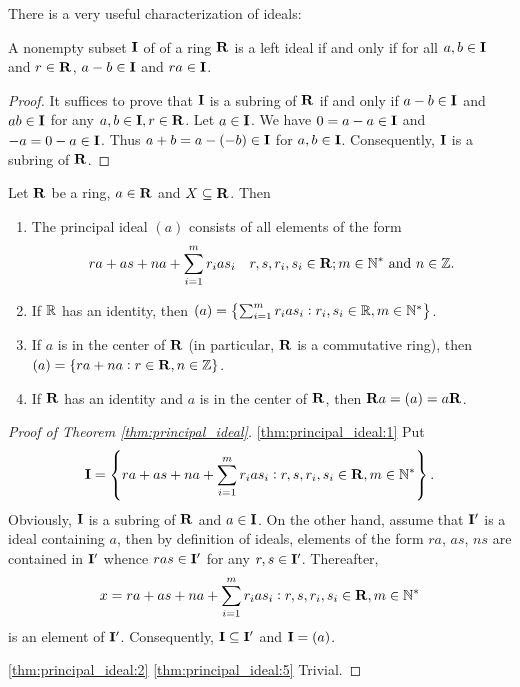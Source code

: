 There is a very useful characterization of ideals:
\begin{thm}
\label{thm:characterization_of_ideals}
A nonempty subset $\mathbf{I}$ of of a ring $\mathbf{R}$ is a left ideal if and only if 
for all $a, b \in \mathbf{I}$ and $r \in \mathbf{R}$, $a - b \in \mathbf{I}$ and $ra \in \mathbf{I}$. 
\end{thm}
\begin{proof}
It suffices to prove that $\mathbf{I}$ is a subring of $\mathbf{R}$ if and only if 
$a - b \in \mathbf{I}$ and $ab \in \mathbf{I}$ for any $a, b \in \mathbf{I}, r \in \mathbf{R}$. 
Let $a \in \mathbf{I}$. We have $0 = a - a \in \mathbf{I}$ and $-a = 0 - a \in \mathbf{I}$. 
Thus $a + b = a - (-b) \in \mathbf{I}$ for $a, b \in \mathbf{I}$. 
Consequently, $\mathbf{I}$ is a subring of $\mathbf{R}$.
\end{proof}
\begin{thm}
\label{thm:principal_ideal}
Let $\mathbf{R}$ be a ring, $a \in \mathbf{R}$ and $X \subseteq \mathbf{R}$. Then 
\begin{enumerate}
    \item \label{thm:principal_ideal:1}
    The principal ideal $(a)$ consists of all elements of the form 
    \begin{equation}
        ra + as + na + \sum_{i=1}^{m}r_ias_i \quad 
        r, s, r_i, s_i \in \mathbf{R}; m \in \mathbb{N}^\ast \text{ and } n \in \mathbb{Z}.
    \end{equation}
    \item \label{thm:principal_ideal:2}
    If $\mathbb{R}$ has an identity, then $(a) = \left\{ 
        \sum_{i=1}^m r_i a s_i : r_i, s_i \in \mathbb{R}, m \in \mathbb{N}^\ast 
    \right\}$.
    \item \label{thm:principal_ideal:3}
    If $a$ is in the center of $\mathbf{R}$ (in particular, $\mathbf{R}$ is a commutative
    ring), then $(a) = \{ra + na: r \in \mathbf{R}, n \in \mathbb{Z}\}$.
    \item \label{thm:principal_ideal:5}
    If $\mathbf{R}$ has an identity and $a$ is in the center of $\mathbf{R}$, then $\mathbf{R} a 
    = (a) = a \mathbf{R}$.
\end{enumerate}
\end{thm}
\begin{proof}[Proof of Theorem \ref{thm:principal_ideal}]
\ref{thm:principal_ideal:1} Put 
\begin{equation}
    \mathbf{I} = \left\{
        ra + as + na + \sum_{i=1}^m r_i a s_i: r, s, r_i, s_i \in \mathbf{R}, 
        m \in \mathbb{N}^\ast
    \right\}.
\end{equation}
Obviously, $\mathbf{I}$ is a subring of $\mathbf{R}$ and $a \in \mathbf{I}$. On the other hand, 
assume that $\mathbf{I}'$ is a ideal containing $a$, then by definition of ideals, 
elements of the form $ra$, $as$, $ns$ are contained in $\mathbf{I}'$ whence $ras 
\in \mathbf{I}'$ for any $r, s \in \mathbf{I}'$. Thereafter, 
\begin{equation}
    x = ra + as + na + \sum_{i=1}^m r_i a s_i: r, s, r_i, s_i \in \mathbf{R}, 
    m \in \mathbb{N}^\ast
\end{equation}
is an element of $\mathbf{I}'$. Consequently, $\mathbf{I} \subseteq \mathbf{I}'$ and $\mathbf{I} = (a)$.

\ref{thm:principal_ideal:2} \ref{thm:principal_ideal:5} Trivial.
\end{proof}

